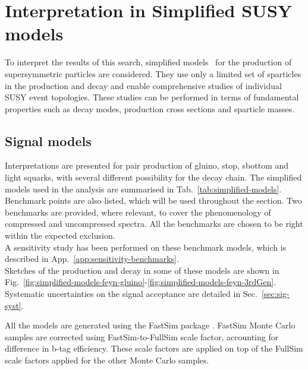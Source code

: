 \section{Interpretation in Simplified SUSY models}
\label{sec:susy}
To interpret the results of this search, simplified
models~\cite{Alwall:2008ag,Alwall:2008va,Alves:2011wf} for the production of supersymmetric particles are considered. 
They use only a limited set of sparticles in the production and
decay and enable comprehensive studies of individual SUSY event
topologies. These studies can be performed in terms of
fundamental properties such as decay modes, production cross sections and sparticle masses. 

\subsection{Signal models}
\label{sec:susy_models}
Interpretations are presented for pair production of gluino, stop, sbottom and light squarks, 
with several different possibility for the decay chain. 
The simplified models used in the analysis are summarised in Tab.~\ref{tab:simplified-models}. 
Benchmark points are also listed, which will be used throughout the section. 
Two benchmarks are provided, where relevant, to cover the phenomenology of compressed and uncompressed spectra. 
All the benchmarks are chosen to be right within the expected exclusion. \\
A sensitivity study has been performed on these benchmark models, which is described in App.~\ref{app:sensitivity-benchmarks}. \\
Sketches of the production and decay in some of these models are shown in Fig.~\ref{fig:simplified-models-feyn-gluino}-\ref{fig:simplified-models-feyn-3rdGen}.
Systematic uncertainties on the signal acceptance are detailed in Sec.~\ref{sec:sig-syst}. 

All the models are generated using the FastSim package \cite{Abdullin:2011zz}. 
FastSim Monte Carlo samples are corrected using FastSim-to-FullSim scale factor, 
accounting for difference in b-tag efficiency. 
These scale factors are applied on top of the FullSim scale factors applied for the 
other Monte Carlo samples.


